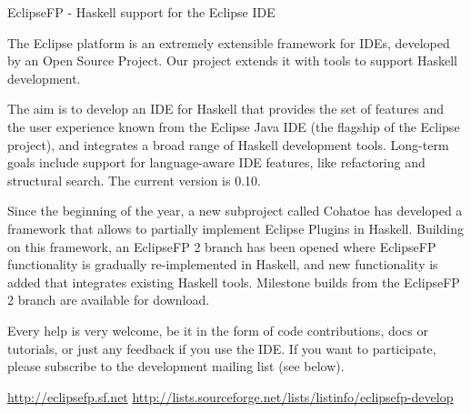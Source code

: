 \documentclass{article}
\begin{document}
\begin{hcarentry}{EclipseFP - Haskell support for the Eclipse IDE}

\makeheader

The Eclipse platform is an extremely extensible framework for IDEs, developed 
by an Open Source Project. Our project extends it with tools to support Haskell
development.

The aim is to develop an IDE for Haskell that provides the set of features and
the user experience known from the Eclipse Java IDE (the flagship of the 
Eclipse project), and integrates a broad range of Haskell development tools. 
Long-term goals include support for language-aware IDE features, like 
refactoring and structural search. The current version is 0.10.

Since the beginning of the year, a new subproject called Cohatoe has 
developed a framework that allows to partially implement Eclipse Plugins
in Haskell. Building on this framework, an EclipseFP 2 branch has been opened
where EclipseFP functionality is gradually re-implemented in Haskell, and new
functionality is added that integrates existing Haskell tools. Milestone 
builds from the EclipseFP 2 branch are available for download.

Every help is very welcome, be it in the form of code contributions, docs or 
tutorials, or just any feedback if you use the IDE. If you want to 
participate, please subscribe to the development mailing list (see below).

\FurtherReading
  \url{http://eclipsefp.sf.net}
  \url{http://lists.sourceforge.net/lists/listinfo/eclipsefp-develop}
\end{hcarentry}
\end{document}
